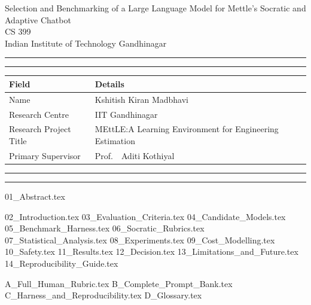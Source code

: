 \documentclass[10pt, a4paper]{article}
\makeatletter
\newcommand{\studentname}{Kshitish Kiran Madbhavi}
\newcommand{\researchcentre}{IIT Gandhinagar}
\newcommand{\projecttitle}{MEttLE:\@ A Learning Environment for Engineering Estimation}
\newcommand{\supervisor}{Prof.~\ Aditi Kothiyal}
\makeatother
\begin{document}
\begin{center}
{\Huge{Selection and Benchmarking of a Large Language Model for Mettle's Socratic and Adaptive Chatbot}} \\
\vspace{2mm}
{\Large{CS 399}} \\
\vspace{1mm}
{\Large{Indian Institute of Technology Gandhinagar}}
\end{center}

\vspace{5mm}
\hrule
\vspace{1mm}
\hrule

\vspace{3mm}
\begin{tabularx}{0.75\textwidth}{@{}lX@{}}
	\toprule
	\textbf{Field} & \textbf{Details} \\ \midrule
Name & \studentname \\
Research Centre & \researchcentre \\
Research Project Title & \projecttitle \\
Primary Supervisor & \supervisor \\
\bottomrule
\end{tabularx}

\vspace{3mm}
\hrule
\vspace{1mm}
\hrule

{01_Abstract.tex}

\newpage

\setcounter{tocdepth}{2}

\tableofcontents
\newpage
\listoffigures
\newpage
\listoftables

\newpage

{02_Introduction.tex}
{03_Evaluation_Criteria.tex}
{04_Candidate_Models.tex}
{05_Benchmark_Harness.tex}
{06_Socratic_Rubrics.tex}
{07_Statistical_Analysis.tex}
{08_Experiments.tex}
{09_Cost_Modelling.tex}
{10_Safety.tex}
{11_Results.tex}
{12_Decision.tex}
{13_Limitations_and_Future.tex}
{14_Reproducibility_Guide.tex}

\appendix

{A_Full_Human_Rubric.tex}
{B_Complete_Prompt_Bank.tex}
{C_Harness_and_Reproducibility.tex}
{D_Glossary.tex}
\end{document}
